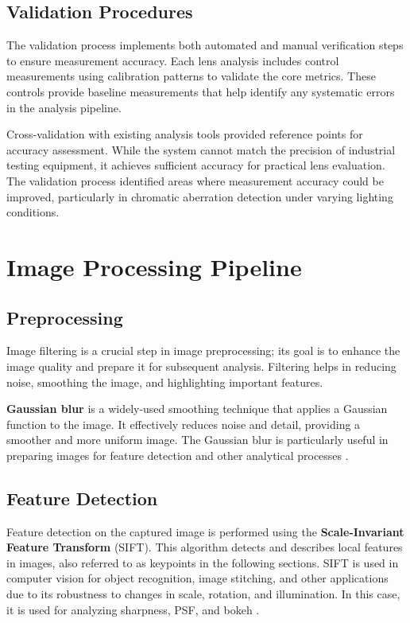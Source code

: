 \subsection{Validation Procedures} 
The validation process implements both automated and manual verification steps to ensure measurement accuracy. Each lens analysis includes control measurements using calibration patterns to validate the core metrics. These controls provide baseline measurements that help identify any systematic errors in the analysis pipeline.

Cross-validation with existing analysis tools provided reference points for accuracy assessment. While the system cannot match the precision of industrial testing equipment, it achieves sufficient accuracy for practical lens evaluation. The validation process identified areas where measurement accuracy could be improved, particularly in chromatic aberration detection under varying lighting conditions.


\section{Image Processing Pipeline}

\subsection{Preprocessing}
Image filtering is a crucial step in image preprocessing; its goal is to enhance the image quality and prepare it for subsequent analysis. Filtering helps in reducing noise, smoothing the image, and highlighting important features.

\textbf{Gaussian blur} is a widely-used smoothing technique that applies a Gaussian function to the image. It effectively reduces noise and detail, providing a smoother and more uniform image. The Gaussian blur is particularly useful in preparing images for feature detection and other analytical processes \cite{gaussian}.

\subsection{Feature Detection}
Feature detection on the captured image is performed using the \textbf{Scale-Invariant Feature Transform} (SIFT). This algorithm detects and describes local features in images, also referred to as keypoints in the following sections. SIFT is used in computer vision for object recognition, image stitching, and other applications due to its robustness to changes in scale, rotation, and illumination. In this case, it is used for analyzing sharpness, PSF, and bokeh \cite{Sift}.

